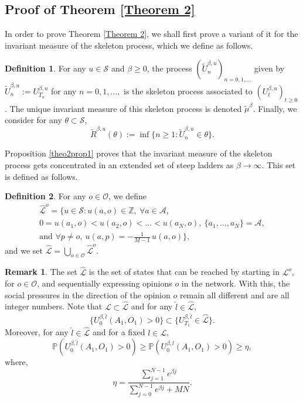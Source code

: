 \documentclass[11pt]{article}
\theoremstyle{definition}
\newtheorem{definition}{Definition}
\newtheorem{remark}{Remark}
\newcommand\ddfrac[2]{\frac{\displaystyle #1}{\displaystyle #2}}
\newcommand{\st}{\mathcal{S}}
\newcommand{\opn}{\mathcal{O}}
\begin{document}
\subsection{Proof of Theorem \ref{Theorem 2}} \label{subsec:T2}

In order to prove Theorem \ref{Theorem 2}, we shall first prove a variant of it for the invariant measure of the skeleton process, which we define as follows.

\begin{definition}
For any $u\in \st$ and $\beta \geq 0$, the process $(\tilde{U}_n^{\beta,u})_{n=0,1,\ldots}$ given by $\tilde{U}_n^{\beta,u}:= U_{T_n}^{\beta,u}$ for any $n=0,1,\ldots,$ is the skeleton process associated to $(U_t^{\beta, u})_{t\geq 0}$. The unique invariant measure of this skeleton process is denoted $\tilde{\mu}^\beta$. Finally, we consider for any $\theta\subset \st$,
$$
\tilde{R}^{\beta,u}(\theta):=\inf\{n\geq 1: \tilde{U}_n^{\beta,u} \in \theta\}.
$$
\end{definition}




Proposition \ref{theo2prop1} proves that the invariant measure of the skeleton process gets concentrated in an extended set of steep ladders as $\beta \to \infty$. This set is defined as follows.

\begin{definition}\label{def:hatladder}
For any $o \in \mathcal{O}$, we define
\begin{multline*}
    \hat{\mathcal{L}}^{o} = \{ u \in \mathcal{S} : u(a,o) \in \mathbb{Z},\ \forall a \in \mathcal{A}, \\
    0 = u(a_1,o) < u(a_2,o) < \ldots < u(a_N,o),\ \{a_1,\ldots,a_N\} = \mathcal{A}, \\
    \text{and } \forall p \neq o,\ u(a,p) = -\tfrac{1}{M-1}\, u(a,o) \},
\end{multline*}
and we set $\hat{\mathcal{L}} = \bigcup_{o \in \mathcal{O}} \hat{\mathcal{L}}^{o}$.
\end{definition}

\begin{remark} \label{rem:hatladder}
The set $\hat{\mathcal{L}}$ is the set of states that can be reached by starting in $\mathcal{L}^{o}$, for $o\in \opn$, and sequentially expressing opinions $o$ in the network. With this, the social pressures in the direction of the opinion $o$ remain all different and are all integer numbers.
Note that $\mathcal{L}\subset \hat{\mathcal{L}}$ and for any $\hat{l} \in \hat{\mathcal{L}}$, 
$$\{U^{\beta,\hat{l}}_0(A_1,O_1)>0\} \subset \{ U^{\beta,\hat{l}}_{T_1} \in \hat{\mathcal{L}}\}.
$$
Moreover, for any $\hat{l}\in\hat{\mathcal{L}}$ and for a fixed $l\in \mathcal{L}$,
$$
\mathbb{P}(U^{\beta,\hat{l}}_0(A_1,O_1)>0)\geq \mathbb{P}(U^{\beta,l}_0(A_1,O_1)>0)\geq \eta,
$$
where,
    $$
        \eta = \ddfrac{\sum^{N-1}_{j=1}e^{\beta j}}{\sum^{N-1}_{j=0}e^{\beta j}+MN}.
    $$

    
\end{remark}
\end{document}
